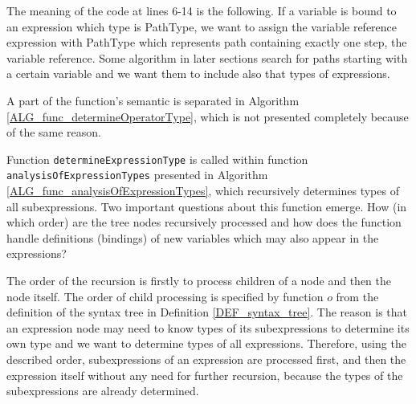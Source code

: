 The meaning of the code at lines 6-14 is the following. If a variable is bound to an expression which type is PathType, we want to assign the variable reference expression with PathType which represents path containing exactly one step, the variable reference. Some algorithm in later sections search for paths starting with a certain variable and we want them to include also that types of expressions.	

A part of the function's semantic is separated in Algorithm \ref{ALG_func_determineOperatorType}, which is not presented completely because of the same reason.

Function \texttt{determineExpressionType} is called within function \texttt{analysis\-Of\-Expression\-Types} presented in Algorithm \ref{ALG_func_analysisOfExpressionTypes}, which recursively determines types of all subexpressions. Two important questions about this function emerge. How (in which order) are the tree nodes recursively processed and how does the function handle definitions (bindings) of new variables which may also appear in the expressions?

The order of the recursion is firstly to process children of a node and then the node itself. The order of child processing is specified by function $o$ from the definition of the syntax tree in Definition \ref{DEF_syntax_tree}. The reason is that an expression node may need to know types of its subexpressions to determine its own type and we want to determine types of all expressions. Therefore, using the described order, subexpressions of an expression are processed first, and then the expression itself without any need for further recursion, because the types of the subexpressions are already determined.

